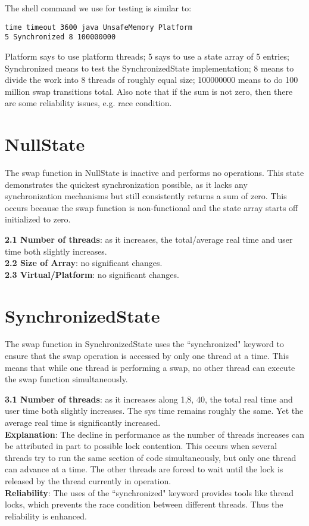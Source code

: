 \documentclass[letterpaper,twocolumn,10pt]{article}
\begin{document}
\noindent The shell command we use for testing is similar to:
\begin{verbatim}
time timeout 3600 java UnsafeMemory Platform
5 Synchronized 8 100000000
\end{verbatim}
Platform says to use platform threads; 5 says to use a state
array of 5 entries; Synchronized means to test the 
SynchronizedState implementation; 8 means to divide the 
work into 8 threads of roughly equal size; 100000000 means
to do 100 million swap transitions total. Also note that if the
sum is not zero, then there are some reliability issues, e.g.
race condition.

\section{NullState}

The swap function in NullState is inactive and performs no
operations. This state demonstrates the quickest
synchronization possible, as it lacks any synchronization
mechanisms but still consistently returns a sum of zero. This
occurs because the swap function is non-functional and the
state array starts off initialized to zero.

\noindent\textbf{2.1 Number of threads}: as it increases, the 
total/average real time and user time both slightly increases.\\
\noindent\textbf{2.2 Size of Array}: no significant changes.\\
\noindent\textbf{2.3 Virtual/Platform}: no significant changes.

\section{SynchronizedState}

The swap function in SynchronizedState uses the ``synchronized"
keyword to ensure that the swap operation is accessed by only
one thread at a time. This means that while one thread is
performing a swap, no other thread can execute the swap
function simultaneously.

\noindent\textbf{3.1 Number of threads}: as it increases along 1,8, 40,
the total real time and user time both slightly increases. The sys
time remains roughly the same. Yet the average real time
is significantly increased.\\
\textbf{Explanation}: The decline in performance as the number
of threads increases can be attributed in part to possible lock
contention. This occurs when several threads try to run the
same section of code simultaneously, but only one thread
can advance at a time. The other threads are forced to wait
until the lock is released by the thread currently in operation.\\
\textbf{Reliability}: The uses of the ``synchronized" keyword
provides tools like thread locks, which prevents the race
condition between different threads. Thus the reliability is
enhanced.
\end{document}
